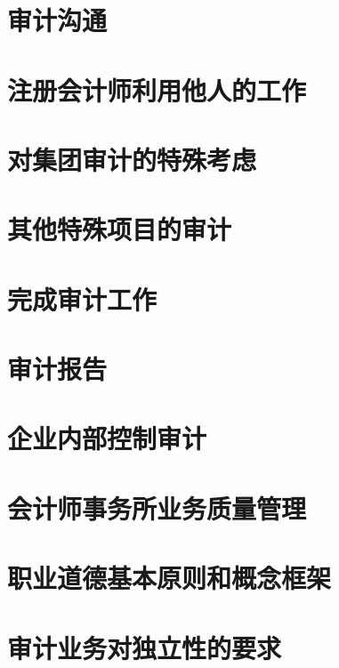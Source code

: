 \documentclass[UTF8,12pt]{ctexart}
\numberwithin{equation}{section} %
\numberwithin{figure}{section}
\numberwithin{table}{section}
\begin{document}
	\newpage
	\section{审计沟通}
	
	\newpage
	\section{注册会计师利用他人的工作}
	
	\newpage
	\section{对集团审计的特殊考虑}
	
	\newpage
	\section{其他特殊项目的审计}
	
	\newpage
	\section{完成审计工作}
	
	\newpage
	\section{审计报告}
	
	\newpage
	\section{企业内部控制审计}
	
	\newpage
	\section{会计师事务所业务质量管理}
	
	\newpage
	\section{职业道德基本原则和概念框架}
	
	\newpage
	\section{审计业务对独立性的要求}
	

	

	
\end{document}
